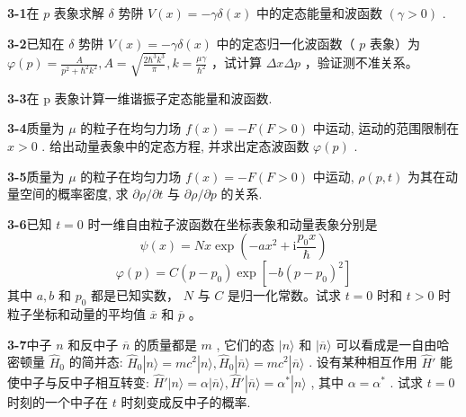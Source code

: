 \textbf{3-1}\quad 在 $p$ 表象求解 $\delta$ 势阱 $V(x) = -\gamma \delta (x)$ 中的定态能量和波函数 $(\gamma > 0)$ .

\vfill

\newpage
\vfill

\noindent
\textbf{3-2}\quad 已知在 $\delta$ 势阱 $V(x) = -\gamma \delta (x)$ 中的定态归一化波函数（ $p$ 表象）为 $\varphi(p) = \frac{A}{p^2 + \hbar^2 k^2}, A = \sqrt{\frac{2\hbar^3 k^3}{\pi}}, k = \frac{\mu\gamma}{\hbar^2}$ ，试计算 $\Delta x \Delta p$ ，验证测不准关系。

\vfill

\newpage
\vfill

\noindent
\textbf{3-3}\quad 在 p 表象计算一维谐振子定态能量和波函数.

\vfill

\newpage
\vfill

\noindent
\textbf{3-4}\quad 质量为 $\mu$ 的粒子在均匀力场 $f(x) = -F(F > 0)$ 中运动, 运动的范围限制在 $x > 0$ . 给出动量表象中的定态方程, 并求出定态波函数 $\varphi(p)$ .

\vfill

\newpage
\vfill

\noindent
\textbf{3-5}\quad 质量为 $\mu$ 的粒子在均匀力场 $f(x) = -F(F > 0)$ 中运动, $\rho(p, t)$ 为其在动量空间的概率密度, 求 $\partial \rho / \partial t$ 与 $\partial \rho / \partial p$ 的关系.

\vfill

\newpage
\vfill

\noindent
\textbf{3-6}\quad 已知 $t = 0$ 时一维自由粒子波函数在坐标表象和动量表象分别是
$$
\psi (x) = N x \exp \left(- a x ^ {2} + \mathrm{i} \frac {p _ {0} x}{\hbar}\right)
$$
$$
\varphi (p) = C \left(p - p _ {0}\right) \exp \left[ - b \left(p - p _ {0}\right) ^ {2} \right]
$$
其中 $a, b$ 和 $p_0$ 都是已知实数， $N$ 与 $C$ 是归一化常数。试求 $t = 0$ 时和 $t > 0$ 时粒子坐标和动量的平均值 $\overline{x}$ 和 $\overline{p}$ 。

\vfill

\newpage
\vfill

\noindent
\textbf{3-7}\quad 中子 $n$ 和反中子 $\overline{n}$ 的质量都是 $m$ , 它们的态 $|n\rangle$ 和 $|\overline{n}\rangle$ 可以看成是一自由哈密顿量 $\hat{H}_0$ 的简并态: $\hat{H}_0 |n\rangle = mc^2 |n\rangle, \hat{H}_0 |\overline{n}\rangle = mc^2 |\overline{n}\rangle$ . 设有某种相互作用 $\hat{H}'$ 能使中子与反中子相互转变: $\hat{H}' |n\rangle = \alpha |\overline{n}\rangle, \hat{H}' |\overline{n}\rangle = \alpha^* |n\rangle$ , 其中 $\alpha = \alpha^*$ . 试求 $t = 0$ 时刻的一个中子在 $t$ 时刻变成反中子的概率.

